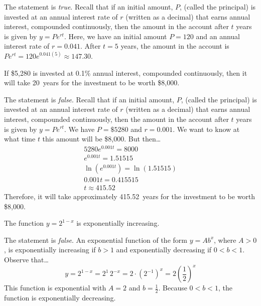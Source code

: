 \documentclass[11pt,letterpaper]{article}
\begin{document}
\sol The statement is \textit{true}. Recall that if an initial amount, $P$, (called the principal) is invested at an annual interest rate of $r$ (written as a decimal) that earns annual interest, compounded continuously, then the amount in the account after $t$ years is given by $y= Pe^{rt}$. Here, we have an initial amount $P= 120$ and an annual interest rate of $r= 0.041$. After $t= 5$ years, the amount in the account is $Pe^{rt}= 120 e^{0.041(5)} \approx 147.30$. \pvspace{1.3cm}



 If \$5,280 is invested at 0.1\% annual interest, compounded continuously, then it will take 20~years for the investment to be worth \$8,000. \pspace

\sol The statement is \textit{false}. Recall that if an initial amount, $P$, (called the principal) is invested at an annual interest rate of $r$ (written as a decimal) that earns annual interest, compounded continuously, then the amount in the account after $t$ years is given by $y= Pe^{rt}$. We have $P= \$5280$ and $r= 0.001$. We want to know at what time $t$ this amount will be \$8,000. But then\dots
	\[
	\begin{gathered}
	5280 e^{0.001t}= 8000 \\
	e^{0.001t}= 1.51515 \\
	\ln(e^{0.001t})= \ln(1.51515) \\
	0.001t= 0.415515 \\
	t \approx 415.52
	\end{gathered}
	\]
Therefore, it will take approximately 415.52~years for the investment to be worth \$8,000. \pvspace{1.3cm}



 The function $y= 2^{1-x}$ is exponentially increasing. \pspace

\sol The statement is \textit{false}. An exponential function of the form $y= Ab^x$, where $A > 0$, is exponentially increasing if $b > 1$ and exponentially decreasing if $0 < b < 1$. Observe that\dots
	\[
	y= 2^{1 - x}= 2^1 \, 2^{-x}= 2 \cdot (2^{-1})^x= 2 \left( \dfrac{1}{2} \right)^x
	\]
This function is exponential with $A= 2$ and $b= \frac{1}{2}$. Because $0 < b < 1$, the function is exponentially decreasing. 
\end{document}
